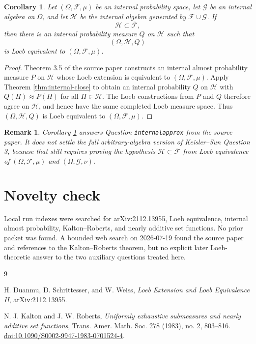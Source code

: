 \documentclass[11pt]{amsart}
\newtheorem{corollary}{Corollary}
\newtheorem{remark}{Remark}
\newcommand{\cF}{\mathcal F}
\newcommand{\cG}{\mathcal G}
\newcommand{\cH}{\mathcal H}
\newcommand{\Loeb}[1]{\overline{#1}}
\begin{document}
\begin{corollary}\label{cor:internalapprox}
Let \((\Omega,\cF,\mu)\) be an internal probability space, let \(\cG\) be an
internal algebra on \(\Omega\), and let \(\cH\) be the internal algebra
generated by \(\cF\cup\cG\).  If
\[
  \cH\subset \Loeb{\cF},
\]
then there is an internal probability measure \(Q\) on \(\cH\) such that
\[
  (\Omega,\cH,Q)
\]
is Loeb equivalent to \((\Omega,\cF,\mu)\).
\end{corollary}

\begin{proof}
Theorem 3.5 of the source paper constructs an internal almost probability
measure \(P\) on \(\cH\) whose Loeb extension is equivalent to
\((\Omega,\cF,\mu)\).  Apply Theorem \ref{thm:internal-close} to obtain an
internal probability \(Q\) on \(\cH\) with \(Q(H)\approx P(H)\) for all
\(H\in\cH\).  The Loeb constructions from \(P\) and \(Q\) therefore agree on
\(\cH\), and hence have the same completed Loeb measure space.  Thus
\((\Omega,\cH,Q)\) is Loeb equivalent to \((\Omega,\cF,\mu)\).
\end{proof}

\begin{remark}
Corollary \ref{cor:internalapprox} answers Question \texttt{internalapprox}
from the source paper.  It does not settle the full arbitrary-algebra version
of Keisler--Sun Question 3, because that still requires proving the hypothesis
\(\cH\subset\Loeb{\cF}\) from Loeb equivalence of \((\Omega,\cF,\mu)\) and
\((\Omega,\cG,\nu)\).
\end{remark}

\section{Novelty check}

Local run indexes were searched for arXiv:2112.13955, Loeb equivalence,
internal almost probability, Kalton--Roberts, and nearly additive set
functions.  No prior packet was found.  A bounded web search on 2026-07-19
found the source paper and references to the Kalton--Roberts theorem, but no
explicit later Loeb-theoretic answer to the two auxiliary questions treated
here.

\begin{thebibliography}{9}

H. Duanmu, D. Schrittesser, and W. Weiss,
\emph{Loeb Extension and Loeb Equivalence II},
arXiv:2112.13955.

N. J. Kalton and J. W. Roberts,
\emph{Uniformly exhaustive submeasures and nearly additive set functions},
Trans. Amer. Math. Soc. 278 (1983), no. 2, 803--816.
\href{https://doi.org/10.1090/S0002-9947-1983-0701524-4}
{doi:10.1090/S0002-9947-1983-0701524-4}.

\end{thebibliography}
\end{document}
